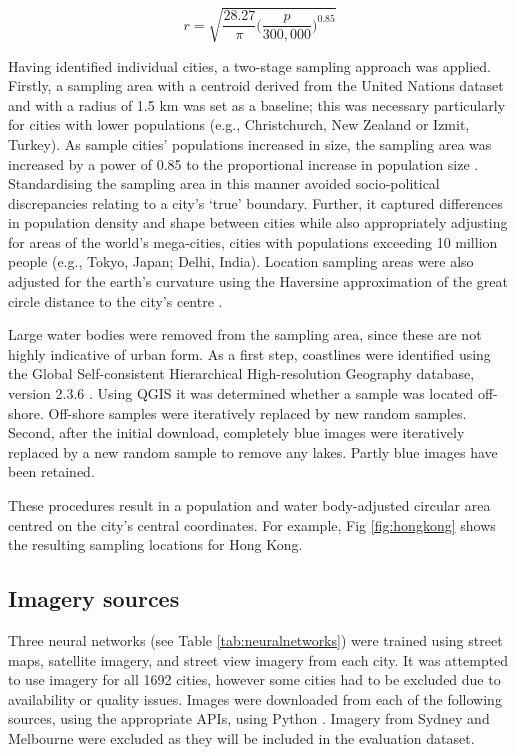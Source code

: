 \documentclass[10pt,letterpaper,hidelinks]{article}
\begin{document}
\begin{equation}
r = \sqrt{ \frac{28.27}{\pi} \bigg( \frac{p}{300,000}  \bigg)^{0.85} }
\end{equation}

Having identified individual cities, a two-stage sampling approach was applied. Firstly, a sampling area with a centroid derived from the United Nations dataset and with a radius of 1.5 km was set as a baseline; this was necessary particularly for cities with lower populations (e.g., Christchurch, New Zealand or Izmit, Turkey). As sample cities' populations increased in size, the sampling area was increased by a power of 0.85 to the proportional increase in population size \cite{Barthelemy2016}. Standardising the sampling area in this manner avoided socio-political discrepancies relating to a city's `true' boundary. Further, it captured differences in population density and shape between cities while also appropriately adjusting for areas of the world's mega-cities, cities with populations exceeding 10 million people (e.g., Tokyo, Japan;  Delhi, India). Location sampling areas were also adjusted for the earth's curvature using the Haversine approximation of the great circle distance to the city's centre \cite{Sinnott1984}. 

Large water bodies were removed from the sampling area, since these are not highly indicative of urban form. As a first step, coastlines were identified using the Global Self-consistent Hierarchical High-resolution Geography database, version 2.3.6 \cite{Wessel1996}. Using QGIS \cite{QGIS2009} it was determined whether a sample was located off-shore. Off-shore samples were iteratively replaced by new random samples. Second, after the initial download, completely blue images were iteratively replaced by a new random sample to remove any lakes. Partly blue images have been retained.

These procedures result in a population and water body-adjusted circular area centred on the city's central coordinates. For example, Fig \ref{fig:hongkong} shows the resulting sampling locations for Hong Kong.


\label{methodsimagery}
\subsection*{Imagery sources}

Three neural networks (see Table \ref{tab:neuralnetworks}) were trained using street maps, satellite imagery, and street view imagery from each city. It was attempted to use imagery for all 1692 cities, however some cities had to be excluded due to availability or quality issues. Images were downloaded from each of the following sources, using the appropriate APIs, using Python \cite{Python2016}. Imagery from Sydney and Melbourne were excluded as they will be included in the evaluation dataset. 
\end{document}
